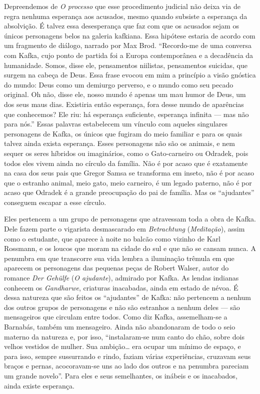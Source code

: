 Depreendemos de \textit{O processo} que esse procedimento judicial não deixa
via de regra nenhuma esperança aos acusados, mesmo quando subsiste a
esperança da absolvição. É talvez essa desesperança que faz com que os
acusados sejam os únicos personagens belos na galeria kafkiana. Essa
hipótese estaria de acordo com um fragmento de diálogo, narrado por Max
Brod. ``Recordo-me de uma conversa com Kafka, cujo ponto de partida foi
a Europa contemporânea e a decadência da humanidade. Somos, disse ele,
pensamentos niilistas, pensamentos suicidas, que surgem na cabeça de
Deus. Essa frase evocou em mim a princípio a visão gnóstica do mundo:
Deus como um demiurgo perverso, e o mundo como seu pecado original. Oh
não, disse ele, nosso mundo é apenas um mau humor de Deus, um dos seus
maus dias. Existiria então esperança, fora desse mundo de aparências que
conhecemos? Ele riu: há esperança suficiente, esperança infinita --- mas
não para nós.'' Essas palavras estabelecem um vínculo com aqueles
singulares personagens de Kafka, os únicos que fugiram do meio familiar
e para os quais talvez ainda exista esperança. Esses personagens não são
os animais, e nem sequer os seres híbridos ou imaginários, como o
Gato-carneiro ou Odradek, pois todos eles vivem ainda no círculo da
família. Não é por acaso que é exatamente na casa dos seus pais que
Gregor Samsa se transforma em inseto, não é por acaso que o estranho
animal, meio gato, meio carneiro, é um legado paterno, não é por acaso
que Odradek é a grande preocupação do pai de família. Mas os
``ajudantes'' conseguem escapar a esse círculo.

Eles pertencem a um grupo de personagens que atravessam toda a obra de
Kafka. Dele fazem parte o vigarista desmascarado em \textit{Betrachtung}
(\textit{Meditação}), assim como o estudante, que aparece à noite no balcão
como vizinho de Karl Rossmann, e os loucos que moram na cidade do sul e
que não se cansam nunca. A penumbra em que transcorre sua vida lembra a
iluminação trêmula em que aparecem os personagens das pequenas peças de
Robert Walser, autor do romance \textit{Der Gehülfe} (\textit{O ajudante}), admirado
por Kafka. As lendas indianas conhecem os \textit{Gandharwe}, criaturas
inacabadas, ainda em estado de névoa. É dessa natureza que são feitos os
``ajudantes'' de Kafka: não pertencem a nenhum dos outros grupos de
personagens e não são estranhos a nenhum deles --- são mensageiros que
circulam entre todos. Como diz Kafka, assemelham-se a Barnabás, também
um mensageiro. Ainda não abandonaram de todo o seio materno da natureza
e, por isso, ``instalaram-se num canto do chão, sobre dois velhos
vestidos de mulher. Sua ambição\ldots{} era ocupar um mínimo de espaço, e
para isso, sempre sussurrando e rindo, faziam várias experiências,
cruzavam seus braços e pernas, acocoravam-se uns ao lado dos outros e na
penumbra pareciam um grande novelo''. Para eles e seus semelhantes, os
inábeis e os inacabados, ainda existe esperança.

